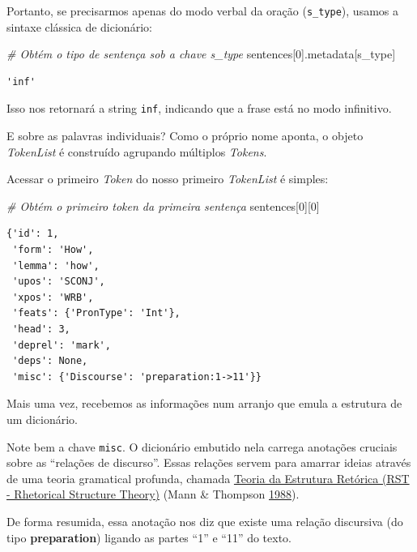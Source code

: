\documentclass[
  brazilian,
]{article}
\newenvironment{Shaded}{}{}
\newcommand{\CommentTok}[1]{\textcolor[rgb]{0.38,0.63,0.69}{\textit{#1}}}
\newcommand{\DecValTok}[1]{\textcolor[rgb]{0.25,0.63,0.44}{#1}}
\newcommand{\NormalTok}[1]{#1}
\newcommand{\StringTok}[1]{\textcolor[rgb]{0.25,0.44,0.63}{#1}}
\begin{document}
Portanto, se precisarmos apenas do modo verbal da oração
(\texttt{s\_type}), usamos a sintaxe clássica de dicionário:

\begin{Shaded}
\begin{Highlighting}[]
\CommentTok{\# Obtém o tipo de sentença sob a chave \textquotesingle{}s\_type\textquotesingle{}}
\NormalTok{sentences[}\DecValTok{0}\NormalTok{].metadata[}\StringTok{\textquotesingle{}s\_type\textquotesingle{}}\NormalTok{]}
\end{Highlighting}
\end{Shaded}

\begin{verbatim}
'inf'
\end{verbatim}

Isso nos retornará a string \texttt{inf}, indicando que a frase está no
modo infinitivo.

E sobre as palavras individuais? Como o próprio nome aponta, o objeto
\emph{TokenList} é construído agrupando múltiplos \emph{Tokens}.

Acessar o primeiro \emph{Token} do nosso primeiro \emph{TokenList} é
simples:

\begin{Shaded}
\begin{Highlighting}[]
\CommentTok{\# Obtém o primeiro token da primeira sentença}
\NormalTok{sentences[}\DecValTok{0}\NormalTok{][}\DecValTok{0}\NormalTok{]}
\end{Highlighting}
\end{Shaded}

\begin{verbatim}
{'id': 1,
 'form': 'How',
 'lemma': 'how',
 'upos': 'SCONJ',
 'xpos': 'WRB',
 'feats': {'PronType': 'Int'},
 'head': 3,
 'deprel': 'mark',
 'deps': None,
 'misc': {'Discourse': 'preparation:1->11'}}
\end{verbatim}

Mais uma vez, recebemos as informações num arranjo que emula a estrutura
de um dicionário.

Note bem a chave \texttt{misc}. O dicionário embutido nela carrega
anotações cruciais sobre as ``relações de discurso''. Essas relações
servem para amarrar ideias através de uma teoria gramatical profunda,
chamada \href{https://www.sfu.ca/rst}{Teoria da Estrutura Retórica (RST
- Rhetorical Structure Theory)} (Mann \& Thompson
\href{https://doi.org/10.1515/text.1.1988.8.3.243}{1988}).

De forma resumida, essa anotação nos diz que existe uma relação
discursiva (do tipo \textbf{preparation}) ligando as partes ``1'' e
``11'' do texto.
\end{document}
